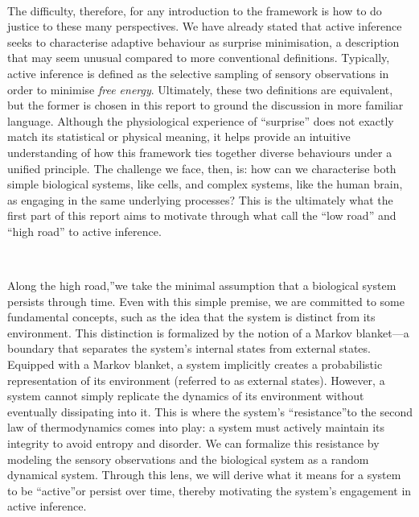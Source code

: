 \documentclass{article}
\begin{document}
\

The difficulty, therefore, for any introduction to the framework is how to do justice to these many perspectives. We have already stated that active inference seeks to characterise adaptive behaviour as surprise minimisation, a description that may seem unusual compared to more conventional definitions. Typically, active inference is defined as the selective sampling of sensory observations in order to minimise \textit{free energy}. Ultimately, these two definitions are equivalent, but the former is chosen in this report to ground the discussion in more familiar language. Although the physiological experience of ``surprise'' does not exactly match its statistical or physical meaning, it helps provide an intuitive understanding of how this framework ties together diverse behaviours under a unified principle. The challenge we face, then, is: how can we characterise both simple biological systems, like cells, and complex systems, like the human brain, as engaging in the same underlying processes? This is the ultimately what the first part of this report aims to motivate through what \citet{parr2022ActiveInference} call the ``low road'' and ``high road'' to active inference. 

\

Along the high road,''we take the minimal assumption that a biological system persists through time. Even with this simple premise, we are committed to some fundamental concepts, such as the idea that the system is distinct from its environment. This distinction is formalized by the notion of a Markov blanket—a boundary that separates the system's internal states from external states. Equipped with a Markov blanket, a system implicitly creates a probabilistic representation of its environment (referred to as external states). However, a system cannot simply replicate the dynamics of its environment without eventually dissipating into it. This is where the system’s ``resistance''to the second law of thermodynamics comes into play: a system must actively maintain its integrity to avoid entropy and disorder. We can formalize this resistance by modeling the sensory observations and the biological system as a random dynamical system. Through this lens, we will derive what it means for a system to be ``active''or persist over time, thereby motivating the system's engagement in active inference.

\
\end{document}
